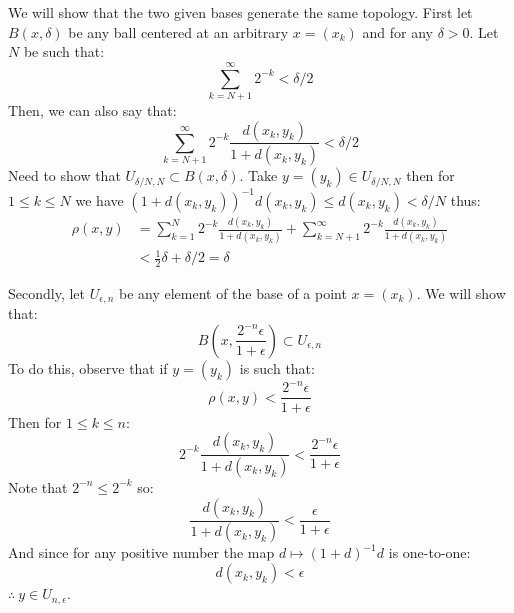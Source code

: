 We will show that the two given bases generate the same topology.
First let $B(x,\delta)$ be any ball centered at an arbitrary $x=(x_k)$ and for any $\delta>0$. 
Let $N$ be such that:
$$\sum_{k=N+1}^\infty 2^{-k} < \delta/2$$
Then, we can also say that:
$$\sum_{k=N+1}^\infty 2^{-k} \frac{d(x_k,y_k)}{1+d(x_k,y_k)}< \delta/2$$
Need to show that $U_{\delta/N,N}\subset B(x,\delta)$.
Take $y=(y_k) \in U_{\delta/N,N}$ then for $1\leq k \leq N$ we have $(1+d(x_k,y_k))^{-1}d(x_k,y_k)\leq d(x_k,y_k) < \delta/N$ thus:
\begin{align*}
\rho(x,y) &= \sum_{k=1}^N 2^{-k} \frac{d(x_k,y_k)}{1+d(x_k,y_k)} + \sum_{k=N+1}^\infty 2^{-k} \frac{d(x_k,y_k)}{1+d(x_k,y_k)} \\
          &< \frac 12 \delta + \delta/2 = \delta
\end{align*}

Secondly, let $U_{\epsilon, n}$ be any element of the base of a point $x=(x_k)$. We will show that:
$$B\left(x,\frac{2^{-n}\epsilon}{1+\epsilon}\right) \subset U_{\epsilon, n}$$
To do this, observe that if $y=(y_k)$ is such that:
$$\rho(x,y)<\frac{2^{-n}\epsilon}{1+\epsilon}$$
Then for $1\leq k \leq n$:
$$2^{-k} \frac{d(x_k,y_k)}{1+d(x_k,y_k)} < \frac{2^{-n}\epsilon}{1+\epsilon}$$
Note that $2^{-n}\leq 2^{-k}$ so:
$$ \frac{d(x_k,y_k)}{1+d(x_k,y_k)} < \frac{\epsilon}{1+\epsilon}$$
And since for any positive number the map $d\mapsto (1+d)^{-1}d$ is one-to-one:
$$d(x_k,y_k)<\epsilon$$
$\therefore \ y\in U_{n,\epsilon}$.
